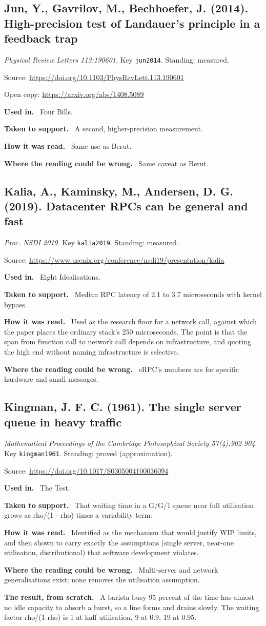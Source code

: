 \documentclass[11pt,oneside]{article}
\newcommand{\field}[1]{\par\noindent\textbf{\color{accent}#1.}\ }
\begin{document}
\hypertarget{src:jun2014}{}
\subsection*{Jun, Y., Gavrilov, M., Bechhoefer, J. (2014). High-precision test of Landauer's principle in a feedback trap}
\noindent\small\emph{Physical Review Letters 113:190601}. Key \texttt{jun2014}. Standing: measured.
\par\noindent\small Source: \url{https://doi.org/10.1103/PhysRevLett.113.190601}
\par\noindent\small Open copy: \url{https://arxiv.org/abs/1408.5089}
\normalsize
\field{Used in} Four Bills.
\field{Taken to support} A second, higher-precision measurement.
\field{How it was read} Same use as Berut.
\field{Where the reading could be wrong} Same caveat as Berut.

\hypertarget{src:kalia2019}{}
\subsection*{Kalia, A., Kaminsky, M., Andersen, D. G. (2019). Datacenter RPCs can be general and fast}
\noindent\small\emph{Proc. NSDI 2019}. Key \texttt{kalia2019}. Standing: measured.
\par\noindent\small Source: \url{https://www.usenix.org/conference/nsdi19/presentation/kalia}
\normalsize
\field{Used in} Eight Idealisations.
\field{Taken to support} Median RPC latency of 2.1 to 3.7 microseconds with kernel bypass.
\field{How it was read} Used as the research floor for a network call, against which the paper places the ordinary stack's 250 microseconds. The point is that the span from function call to network call depends on infrastructure, and quoting the high end without naming infrastructure is selective.
\field{Where the reading could be wrong} eRPC's numbers are for specific hardware and small messages.

\hypertarget{src:kingman1961}{}
\subsection*{Kingman, J. F. C. (1961). The single server queue in heavy traffic}
\noindent\small\emph{Mathematical Proceedings of the Cambridge Philosophical Society 57(4):902-904}. Key \texttt{kingman1961}. Standing: proved (approximation).
\par\noindent\small Source: \url{https://doi.org/10.1017/S0305004100036094}
\normalsize
\field{Used in} The Test.
\field{Taken to support} That waiting time in a G/G/1 queue near full utilisation grows as rho/(1 - rho) times a variability term.
\field{How it was read} Identified as the mechanism that would justify WIP limits, and then shown to carry exactly the assumptions (single server, near-one utilisation, distributional) that software development violates.
\field{Where the reading could be wrong} Multi-server and network generalisations exist; none removes the utilisation assumption.
\field{The result, from scratch} A barista busy 95 percent of the time has almost no idle capacity to absorb a burst, so a line forms and drains slowly. The waiting factor rho/(1-rho) is 1 at half utilisation, 9 at 0.9, 19 at 0.95.
\end{document}
